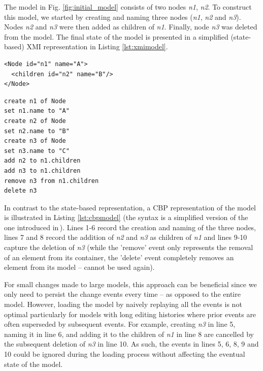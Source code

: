 \documentclass{llncs}
\begin{document}
The model in Fig. \ref{fig:initial_model} consists of two nodes \emph{n1}, \emph{n2}.
To construct this model, we started by creating and naming three nodes (\emph{n1}, \emph{n2} and \emph{n3}).
Nodes \emph{n2} and \emph{n3} were then added as children of \emph{n1}.
Finally, node \emph{n3} was deleted from the model.
The final state of the model is presented in a simplified (state-based) XMI representation in Listing \ref{lst:xmimodel}.

\noindent
\begin{minipage}[t]{0.5\linewidth}
\begin{lstlisting}[style=xmi,caption={State-based representation of the tree model in (simplified) XMI.},label=lst:xmimodel]
<Node id="n1" name="A">
  <children id="n2" name="B"/>
</Node>
\end{lstlisting}
\end{minipage}
\hfill
\begin{minipage}[t]{0.5\linewidth}
\begin{lstlisting}[style=eol,caption={Change-based representation of the tree model.},label=lst:cbpmodel]
create n1 of Node
set n1.name to "A"      
create n2 of Node
set n2.name to "B"      
create n3 of Node
set n3.name to "C"      
add n2 to n1.children   
add n3 to n1.children
remove n3 from n1.children   
delete n3
\end{lstlisting}
\end{minipage}

In contrast to the state-based representation, a CBP representation of the model is illustrated in Listing \ref{lst:cbpmodel} (the syntax is a simplified version of the one introduced in\,\cite{yohannis2017turning}).
Lines 1-6 record the creation and naming of the three nodes, lines 7 and 8 record the addition of \emph{n2} and \emph{n3} as children of \emph{n1} and lines 9-10 capture the deletion of \emph{n3} (while the 'remove' event only represents the removal of an element from its container, the 'delete' event completely removes an element from its model -- cannot be used again).


For small changes made to large models, this approach can be beneficial since we only need to persist the change events every time -- as opposed to the entire model.
However, loading the model by naively replaying all the events is not optimal particularly for models with long editing histories where prior events are often superseded by subsequent events. For example, creating \emph{n3} in line 5, naming it in line 6, and adding it to the children of \emph{n1} in line 8 are cancelled by the subsequent deletion of \emph{n3} in line 10. As such, the events in lines 5, 6, 8, 9 and 10 could be ignored during the loading process without affecting the eventual state of the model.
\end{document}
